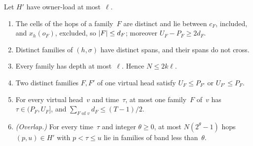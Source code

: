 \begin{lemma}\label{lem:families}
Let $H'$ have owner-load at most~$\ell$.
\begin{enumerate}[label=(\alph*)]
\item The cells of the hops of a family~$F$ are distinct and lie between $c_F$, included, and $x_h(o_F)$, excluded, so
$\lvert F \rvert\le d_F$; moreover $U_F-P_F\ge2d_F$.
\item Distinct families of $(h,\sigma)$ have distinct spans, and their spans do not cross.
\item Every family has depth at most~$\ell$. Hence $N\le2k\ell$.
\item Two distinct families $F,F'$ of one virtual head satisfy $U_F\le P_{F'}$ or $U_{F'}\le P_F$.
\item For every virtual head~$v$ and time~$\tau$, at most one family~$F$ of~$v$ has $\tau\in(P_F,U_F]$, and
$\sum_{F\text{ of }v}d_F\le(T-1)/2$.
\item \emph{(Overlap.)} For every time~$\tau$ and integer $\theta\ge0$, at most $N(2^\theta-1)$ hops
$(p,u)\in H'$ with $p<\tau\le u$ lie in families of band less than~$\theta$.
\end{enumerate}
\end{lemma}

